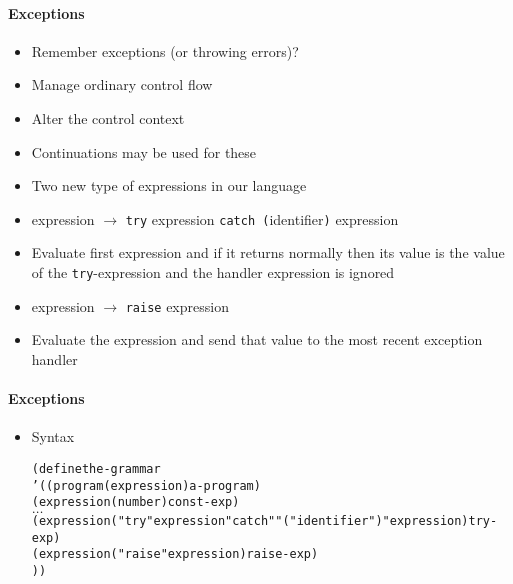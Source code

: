 \documentclass{beamer}
\newcommand{\dotss}{\(\ldots\)}
\begin{document}
\begin{frame}[fragile]
\framesubtitle{Exceptions}
\begin{scriptsize}
\begin{itemize}
\item<1-> Remember exceptions (or throwing errors)?

\item<2-> Manage ordinary control flow

\item<2-> Alter the control context

\item<2-> Continuations may be used for these

\item<3-> Two new type of expressions in our language

\item<4-> expression $\rightarrow$ \texttt{try} expression \texttt{catch (}identifier\texttt{)} expression

\item<4-> Evaluate first expression and if it returns normally then its value is the value of the \texttt{try}-expression and the handler expression is ignored
    
\item<5-> expression $\rightarrow$ \texttt{raise} expression

\item<5-> Evaluate the expression and send that value to the most recent exception handler

\end{itemize}
\end{scriptsize}
\end{frame}


\begin{frame}[fragile]
\framesubtitle{Exceptions}
\begin{scriptsize}
\begin{itemize}
\item<1-> Syntax
\begin{alltt}
(define the-grammar
  '((program (expression) a-program)
    	(expression (number) const-exp)
	\dotss{}
	(expression ("try" expression "catch" "(" identifier ")" expression) try-exp)
	(expression ("raise" expression) raise-exp)
))
\end{alltt}

\end{itemize}
\end{scriptsize}
\end{frame}
\end{document}
